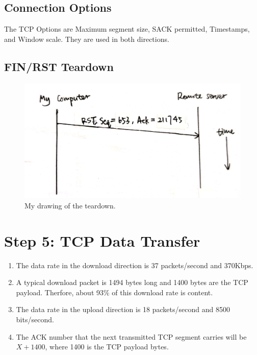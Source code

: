 \documentclass[a4paper]{article}
\begin{document}
\subsection{Connection Options}
The TCP Options are Maximum segment size, SACK permitted, Timestamps, and Window scale. They are used in both directions.
\subsection{FIN/RST Teardown}
\begin{figure}[htbp]
\centering
\includegraphics[scale=0.09]{3.jpg}
\caption{My drawing of the teardown.}
\end{figure}
\section{Step 5: TCP Data Transfer}
\begin{enumerate}
\item
The data rate in the download direction is 37 packets/second and 370Kbps.
\item
A typical download packet is 1494 bytes long and 1400 bytes are the TCP payload. Therfore, about 93$\%$ of this download rate is content.
\item
The data rate in the upload direction is 18 packets/second and 8500 bits/second.
\item
The ACK number that the next transmitted TCP segment carries will be $X+1400$, where 1400 is the TCP payload bytes.
\end{enumerate}
\end{document}
